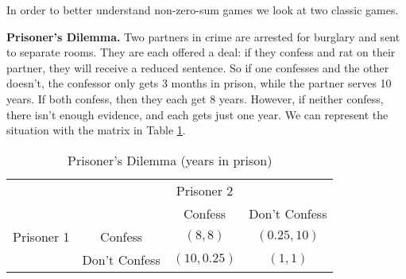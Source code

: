 In order to better understand non-zero-sum games we look at two classic games. 


\begin{example}\label{E:PrisonersDilemma}\textbf{Prisoner's Dilemma.}
Two partners in crime are arrested for  burglary and sent to separate rooms. They are each offered a deal: if they confess and rat on their partner, they will receive a reduced sentence. So if one confesses and the other doesn't, the confessor only gets 3 months in prison, while the partner serves 10 years. If both confess, then they each get 8 years. However, if neither confess, there isn't enough evidence, and each gets just one year. We can represent the situation with the matrix in Table \ref{T:PrisonersDilemma}.



\begin{table}[h]
\centering

\begin{tabular}{cccc}
                      & \multicolumn{3}{c}{Prisoner 2}                                                  \\ \cline{2-4} 
\multicolumn{1}{l|}{} & \multicolumn{1}{l|}{} & \multicolumn{1}{c|}{Confess} & \multicolumn{1}{c|}{Don't Confess} \\ \cline{2-4} 
\multicolumn{1}{l|}{Prisoner 1} & \multicolumn{1}{c|}{Confess} & \multicolumn{1}{c|}{$(8, 8)$} & \multicolumn{1}{c|}{$(0.25, 10)$} \\ \cline{2-4} 
\multicolumn{1}{l|}{} & \multicolumn{1}{c|}{Don't Confess} & \multicolumn{1}{c|}{$(10, 0.25)$} & \multicolumn{1}{c|}{$(1, 1)$} \\ \cline{2-4} 
\end{tabular}
\caption{Prisoner's Dilemma (years in prison)}
\label{T:PrisonersDilemma}
\end{table}
\end{example}


